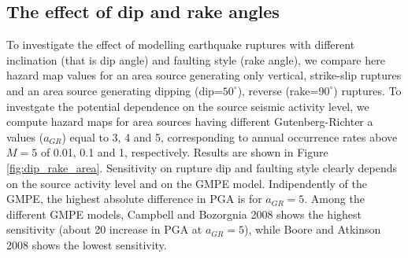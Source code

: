 \subsection{The effect of dip and rake angles}
To investigate the effect of modelling earthquake ruptures with different inclination (that is dip angle) and
faulting style (rake angle), we compare here hazard map values for an area source generating only vertical,
strike-slip ruptures and an area source generating dipping (dip=$50^{\circ}$), reverse (rake=$90^{\circ}$) ruptures.
To investgate the potential dependence on the source seismic activity level, we compute hazard maps for
area sources having different Gutenberg-Richter a values ($a_{GR}$) equal to 3, 4 and 5, corresponding to
annual occurrence rates above $M=5$ of 0.01, 0.1 and 1, respectively. Results are shown in Figure \ref{fig:dip_rake_area}. Sensitivity on rupture dip and faulting style clearly depends on the source activity level and on the GMPE model. Indipendently of the GMPE, the highest absolute difference in PGA is for $a_{GR}=5$. Among the different GMPE models, Campbell and Bozorgnia 2008 shows the highest sensitivity (about 20 %
increase in PGA at $a_{GR}=5$), while Boore and Atkinson 2008 shows the lowest sensitivity.
